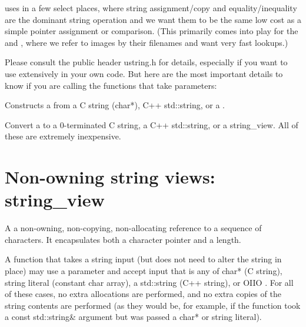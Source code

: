 \OpenImageIO uses \ustring in a few select places, where string
assignment/copy and equality/inequality are the dominant string operation
and we want them to be the same low cost as a simple pointer assignment or
comparison.  (This primarily comes into play for the \ImageCache and
\TextureSystem, where we refer to images by their filenames and want
very fast lookups.)

Please consult the public header {\cf ustring.h} for details, especially if
you want to use \ustring extensively in your own code. But here are the most
important details to know if you are calling the \OpenImageIO functions that
take \ustring parameters:

Constructs a \ustring from a C string ({\cf char*}), C++ {\cf std::string},
or a \stringview.
\apiend

Convert a \ustring to a 0-terminated C string, a C++ {\cf std::string}, or
a {\cf string_view}.  All of these are extremely inexpensive.
\apiend


\section{Non-owning string views: {\cf string_view}}
\label{sec:stringview}

A \stringview a non-owning, non-copying, non-allocating reference to a
sequence of characters.  It encapsulates both a character pointer and a
length.

A function that takes a string input (but does not need to alter the string
in place) may use a \stringview parameter and accept input that is any of
{\cf char*} (C string), string literal (constant char array), a {\cf
std::string} (C++ string), or OIIO \ustring.  For all of these cases, no
extra allocations are performed, and no extra copies of the string  contents
are performed (as they would be, for example, if the function took a const
{\cf std::string\&} argument but was passed a {\cf char*} or string
literal).

